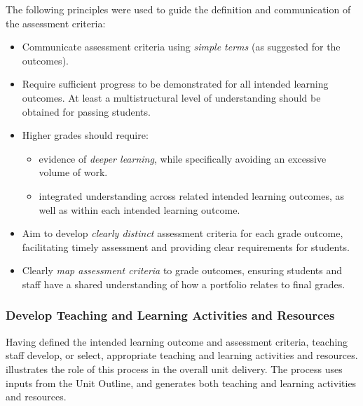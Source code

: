 The following principles were used to guide the definition and communication of the assessment criteria:

\begin{itemize}[noitemsep,nolistsep]
  \item Communicate assessment criteria using \emph{simple terms} (as suggested for the outcomes).
  \item Require sufficient progress to be demonstrated for all intended learning outcomes. At least a multistructural level of understanding should be obtained for passing students.
  \item Higher grades should require:
  \begin{itemize}[noitemsep,nolistsep]
  	\item evidence of \emph{deeper learning}, while specifically avoiding an excessive volume of work.
  	\item integrated understanding across related intended learning outcomes, as well as within each intended learning outcome.
  \end{itemize}
  \item Aim to develop \emph{clearly distinct} assessment criteria for each grade outcome, facilitating timely assessment and providing clear requirements for students.  
  \item Clearly \emph{map assessment criteria} to grade outcomes, ensuring students and staff have a shared understanding of how a portfolio relates to final grades.
\end{itemize}



\subsubsection{Develop Teaching and Learning Activities and Resources} %
\label{ssub:develop_teaching_and_learning_activities_and_resources}

Having defined the intended learning outcome and assessment criteria, teaching staff develop, or select, appropriate teaching and learning activities and resources.  illustrates the role of this process in the overall unit delivery. The process uses inputs from the Unit Outline, and generates both teaching and learning activities and resources.

